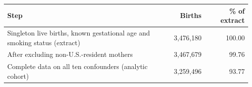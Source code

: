 {\small
\begin{tabular}{lrr}
\toprule
Step & Births & \% of extract \\
\midrule
Singleton live births, known gestational age and smoking status (extract) & 3,476,180 & 100.00 \\
After excluding non-U.S.-resident mothers & 3,467,679 & 99.76 \\
Complete data on all ten confounders (analytic cohort) & 3,259,496 & 93.77 \\
\bottomrule
\end{tabular}
}

